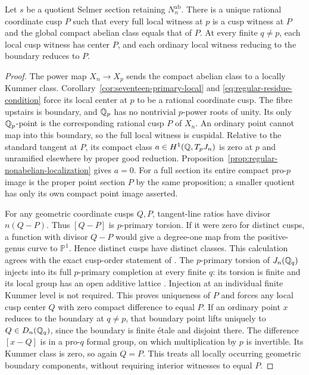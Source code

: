 \begin{lemma}
\label{lem:regular-compact-boundary}
Let $s$ be a quotient Selmer section retaining $N_n^{\mathrm{ab}}$.
There is a unique rational coordinate cusp $P$ such that every
full local witness at $p$ is a cusp witness at $P$ and the global
compact abelian class equals that of $P$. At every finite $q\ne p$,
each local cusp witness has center $P$, and each ordinary local
witness reducing to the boundary reduces to $P$.
\end{lemma}
\begin{proof}
The power map $X_n\to X_p$ sends the compact abelian class to a
locally Kummer class. Corollary~\ref{cor:seventeen-primary-local}
and \eqref{eq:regular-residue-condition} force its local center at
$p$ to be a rational coordinate cusp. The fibre upstairs is boundary,
and $\mathbb Q_p$ has no nontrivial $p$-power roots of unity. Its only
$\mathbb Q_p$-point is the corresponding rational cusp $P$ of $X_n$.
An ordinary point cannot map into this boundary, so the full local
witness is cuspidal. Relative to the standard tangent at $P$, its
compact class $a\in H^1(\mathbb Q,T_pJ_n)$ is zero at $p$ and unramified
elsewhere by proper good reduction.
Proposition~\ref{prop:regular-nonabelian-localization} gives $a=0$.
For a full section its entire compact pro-$p$ image is the proper
point section $P$ by the same proposition; a smaller quotient
has only its own compact point image asserted.

For any geometric coordinate cusps $Q,P$, tangent-line ratios
have divisor $n(Q-P)$. Thus $[Q-P]$ is $p$-primary torsion. If it
were zero for distinct cusps, a function with divisor $Q-P$ would
give a degree-one map from the positive-genus curve to $\mathbb P^1$.
Hence distinct cusps have distinct classes. This calculation agrees
with the exact cusp-order statement of
\citet[p.~191, before Theorem~A]{Coleman1986}.
The $p$-primary torsion of $J_n(\mathbb Q_q)$ injects into its full
$p$-primary completion at every finite $q$: its torsion is finite
and its local group has an open additive lattice
\citep[I.3.3, p.~41]{Milne2006ADT}. Injection at an individual
finite Kummer level is not required. This proves uniqueness of
$P$ and forces any local cusp center $Q$ with zero compact
difference to equal $P$. If an ordinary point $x$ reduces to the
boundary at $q\ne p$, that boundary point lifts uniquely to
$Q\in D_n(\mathbb Q_q)$, since the boundary is finite \'etale and disjoint
there. The difference $[x-Q]$ is in a pro-$q$ formal group, on
which multiplication by $p$ is invertible. Its Kummer class is zero,
so again $Q=P$. This treats all locally occurring geometric
boundary components, without requiring interior witnesses to equal $P$.
\end{proof}

